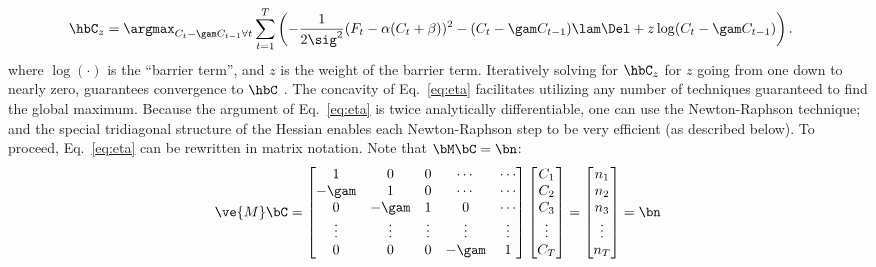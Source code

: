 \begin{align} \label{eq:eta}
\hbC_{\zzz} &= \argmax_{C_t-\gam C_{t-1} \forall t}  \sum_{t=1}^T \left( -\frac{1}{2 \sig^2}(F_t - \alpha(C_t + \beta))^2  -  (C_t-\gam C_{t-1})  \lam \Del + \zzz \log (C_t-\gam C_{t-1}) \right).
\end{align}
\noindent where $\log (\cdot)$ is the ``barrier term'', and $z$ is the weight of the barrier term.  Iteratively solving for $\hbC_{\zzz}$ for $z$ going from one down to nearly zero, guarantees convergence to $\hbC$ \cite{CONV04}. %
The concavity of Eq.~\eqref{eq:eta} facilitates utilizing any number of techniques guaranteed to find the global maximum.  Because the argument of Eq.~\eqref{eq:eta} is twice analytically differentiable, one can use the Newton-Raphson technique; and the special tridiagonal structure of the Hessian enables each Newton-Raphson step to be very efficient (as described below).  To proceed, Eq.~\eqref{eq:eta} can be rewritten in matrix notation.  Note that $\bM \bC = \bn$:
\begin{align} \label{eq:M}
\ve{M} \bC = %
\begin{bmatrix}
1 & 0  & 0 & \cdots & \cdots \\
-\gam & 1 & 0 & \cdots & \cdots \\
0 & -\gam & 1 & 0 & \cdots  \\
\vdots & \vdots & \vdots & \vdots & \vdots  \\
0 & 0 & 0 & -\gam & 1
\end{bmatrix}
\begin{bmatrix}
C_1 \\ C_2 \\ C_3 \\ \vdots \\ C_T  
\end{bmatrix}
= 
\begin{bmatrix}
n_1 \\ n_2 \\ n_3 \\ \vdots  \\ n_T
\end{bmatrix}
= \bn
\end{align}
